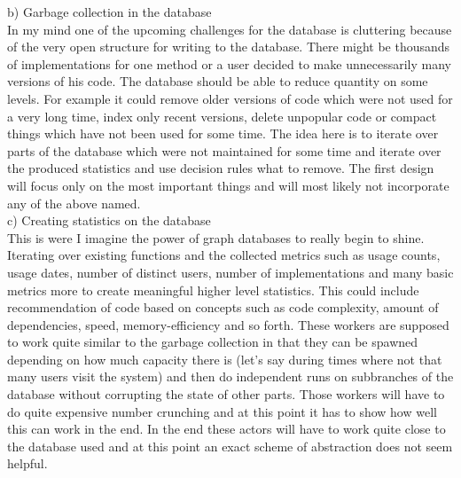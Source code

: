 \documentclass[twoside, 11pt]{scrartcl}
\begin{document}
b) Garbage collection in the database\\
In my mind one of the upcoming challenges for the database is cluttering because of the very open structure for writing to the database.
There might be thousands of implementations for one method or a user decided to make unnecessarily many versions of his code.
The database should be able to reduce quantity on some levels. For example it could remove older versions of code which were not used for a very long time, index only recent versions, delete unpopular code or compact things which have not been used for some time.
The idea here is to iterate over parts of the database which were not maintained for some time and iterate over the produced statistics and use decision rules what to remove. The first design will focus only on the most important things and will most likely not incorporate any of the above named.\\

c) Creating statistics on the database\\
This is were I imagine the power of graph databases to really begin to shine. Iterating over existing functions and the collected metrics such as usage counts, usage dates, number of distinct users, number of implementations and many basic metrics more to create meaningful higher level statistics. This could include recommendation of code based on concepts such as code complexity, amount of dependencies, speed, memory-efficiency and so forth. These workers are supposed to work quite similar to the garbage collection in that they can be spawned depending on how much capacity there is (let's say during times where not that many users visit the system) and then do independent runs on subbranches of the database without corrupting the state of other parts. Those workers will have to do quite expensive number crunching  and at this point it has to show how well this can work in the end. In the end these actors will have to work quite close to the database used and at this point an exact scheme of abstraction does not seem helpful.\\
\end{document}
